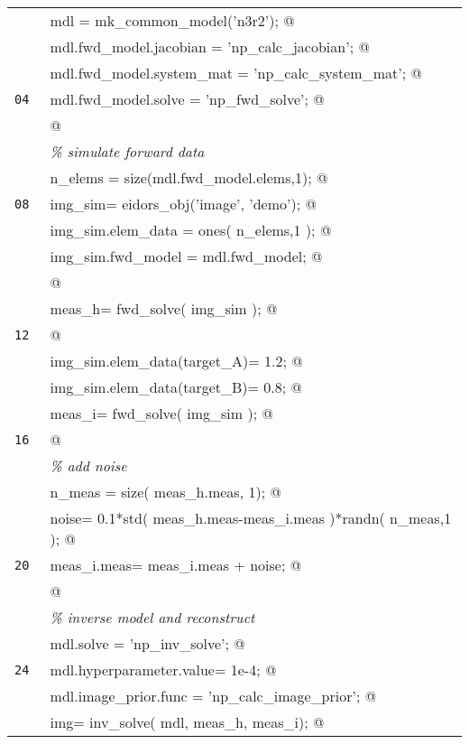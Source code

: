 \documentclass[12pt]{iopart}
\makeatletter
\newcommand{\CN}{\tt\small} %
\newcommand{\CC}{&\verb@}   % start code
\newcommand{\CI}{&\it}   % start code
\makeatother
\begin{document}
\begin{tabular}{ll}
\CN    \CC mdl  = mk_common_model('n3r2');   @\\
\CN    \CC mdl.fwd_model.jacobian   = 'np_calc_jacobian';   @\\
\CN    \CC mdl.fwd_model.system_mat = 'np_calc_system_mat';   @\\
\CN 04 \CC mdl.fwd_model.solve      = 'np_fwd_solve';   @\\
\CN    \CC @\\
\CN    \CI \% simulate forward data \\
\CN    \CC n_elems = size(mdl.fwd_model.elems,1);   @\\
\CN 08 \CC img_sim= eidors_obj('image', 'demo');   @\\
\CN    \CC img_sim.elem_data = ones( n_elems,1 );    @\\
\CN    \CC img_sim.fwd_model = mdl.fwd_model;   @\\
\CN    \CC @\\
\CN    \CC meas_h= fwd_solve( img_sim );   @\\
\CN 12 \CC @\\
\CN    \CC img_sim.elem_data(target_A)= 1.2;   @\\
\CN    \CC img_sim.elem_data(target_B)= 0.8;   @\\
\CN    \CC meas_i= fwd_solve( img_sim );   @\\
\CN 16 \CC @\\
\CN    \CI \% add noise \\
\CN    \CC n_meas = size( meas_h.meas, 1); @\\
\CN    \CC noise= 0.1*std( meas_h.meas-meas_i.meas )*randn( n_meas,1 ); @\\
\CN 20 \CC meas_i.meas= meas_i.meas + noise; @\\
\CN    \CC @\\
\CN    \CI \% inverse model and reconstruct\\
\CN    \CC mdl.solve               = 'np_inv_solve'; @\\
\CN 24 \CC mdl.hyperparameter.value= 1e-4; @\\
\CN    \CC mdl.image_prior.func    = 'np_calc_image_prior'; @\\
\CN    \CC img= inv_solve( mdl, meas_h, meas_i); @\\
\end{tabular}

%
%
\begin{figure}[th]
\end{figure}
\end{document}
